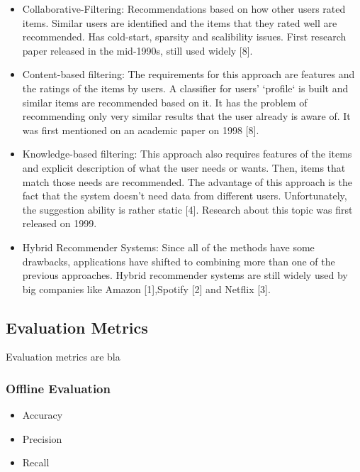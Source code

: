 \begin{itemize}
	\item Collaborative-Filtering: Recommendations based on how other users rated items. Similar users are identified and the items that they rated well are recommended. Has cold-start, sparsity and scalibility issues. First research paper released in the mid-1990s, still used widely [8].
	\item Content-based filtering: The requirements for this approach are features and the ratings of the items by users. A classifier for users' `profile` is built and similar items are recommended based on it. It has the problem of recommending only very similar results that the user already is aware of. It was first mentioned on an academic paper on 1998 [8].
	\item Knowledge-based filtering: This approach also requires features of the items and explicit description of what the user needs or wants. Then, items that match those needs are recommended. The advantage of this approach is the fact that the system doesn't need data from different users. Unfortunately, the suggestion ability is rather static [4]. Research about this topic was first released on 1999.
	\item Hybrid Recommender Systems: Since all of the methods have some drawbacks, applications have shifted to combining more than one of the previous approaches. Hybrid recommender systems are still widely used by big companies like Amazon [1],Spotify [2] and Netflix [3].
\end{itemize}

\subsection{Evaluation Metrics}

Evaluation metrics are bla

\subsubsection{Offline Evaluation}
\begin{itemize}
	\item Accuracy
	\item Precision
	\item Recall
\end{itemize}


